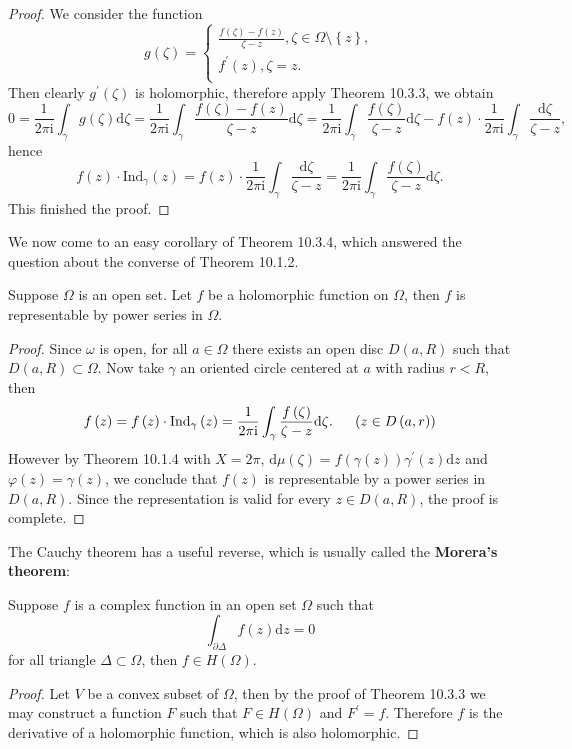 \begin{proof}
We consider the function 
$$
g\left( \zeta \right) =\begin{cases}
	\frac{f\left( \zeta \right) -f\left( z \right)}{\zeta -z},\zeta \in \Omega \setminus \left\{ z \right\} ,\\
	f^{\prime}\left( z \right) ,\zeta =z.\\
\end{cases}
$$
Then clearly $g^\prime(\zeta)$ is holomorphic, therefore apply Theorem 10.3.3, we obtain 
$$
0=\frac{1}{2\pi \mathrm{i}}\int_{\gamma}{g\left( \zeta \right) \mathrm{d}\zeta}=\frac{1}{2\pi \mathrm{i}}\int_{\gamma}{\frac{f\left( \zeta \right) -f\left( z \right)}{\zeta -z}\mathrm{d}\zeta}=\frac{1}{2\pi \mathrm{i}}\int_{\gamma}{\frac{f\left( \zeta \right)}{\zeta -z}\mathrm{d}\zeta}-f\left( z \right) \cdot \frac{1}{2\pi \mathrm{i}}\int_{\gamma}{\frac{\mathrm{d}\zeta}{\zeta -z}},
$$
hence 
$$
f\left( z \right) \cdot \mathrm{Ind}_{\gamma}\left( z \right) =f\left( z \right) \cdot \frac{1}{2\pi \mathrm{i}}\int_{\gamma}{\frac{\mathrm{d}\zeta}{\zeta -z}}=\frac{1}{2\pi \mathrm{i}}\int_{\gamma}{\frac{f\left( \zeta \right)}{\zeta -z}\mathrm{d}\zeta}.
$$
This finished the proof.
\end{proof}
We now come to an easy corollary of Theorem 10.3.4, which answered the question about the converse of Theorem 10.1.2.
\begin{theorem}
Suppose $\Omega$ is an open set. Let $f$ be a holomorphic function on $\Omega$, then $f$ is representable by power series in $\Omega$.
\end{theorem}
\begin{proof}
Since $\omega$ is open, for all $a\in\Omega$ there exists an open disc $D(a,R)$ such that $D(a,R)\subset\Omega$. Now take $\gamma$ an oriented circle centered at $a$ with radius $r<R$, then 
$$
f\left( z \right) =f\left( z \right) \cdot \mathrm{Ind}_{\gamma}\left( z \right) =\frac{1}{2\pi \mathrm{i}}\int_{\gamma}{\frac{f\left( \zeta \right)}{\zeta -z}\mathrm{d}\zeta}.\hspace{0.5cm}\left( z\in D\left( a,r \right) \right) 
$$
However by Theorem 10.1.4 with $X=2\pi$, $\mathrm{d}\mu(\zeta)=f(\gamma(z))\gamma^\prime(z)\mathrm{d}z$ and $\varphi(z)=\gamma(z)$, we conclude that $f(z)$ is representable by a power series in $D(a,R)$. Since the representation is valid for every $z\in D(a,R)$, the proof is complete.
\end{proof}
The Cauchy theorem has a useful reverse, which is usually called the \textbf{Morera's theorem}: 
\begin{theorem}
Suppose $f$ is a complex function in an open set $\Omega$ such that 
$$\int_{\partial\Delta}f(z)\mathrm{d}z=0$$
for all triangle $\Delta\subset\Omega$, then $f\in H(\Omega)$.
\end{theorem}
\begin{proof}
Let $V$ be a convex subset of $\Omega$, then by the proof of Theorem 10.3.3 we may construct a function $F$ such that $F\in H(\Omega)$ and $F^\prime=f$. Therefore $f$ is the derivative of a holomorphic function, which is also holomorphic.
\end{proof}
